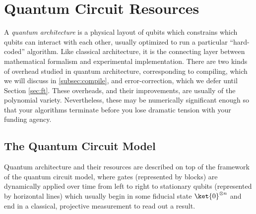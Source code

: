 \section{Quantum Circuit Resources}
\label{sec:circuit}

A \emph{quantum architecture} is a physical layout of qubits which constrains
which qubits can interact with each other, usually optimized to run a particular
``hard-coded'' algorithm. Like classical architecture, it is the
connecting layer between mathematical formalism and experimental implementation.
There are two kinds of overhead studied in quantum architecture,
corresponding to compiling, which we will discuss in \ref{subsec:compile},
and error-correction, which we defer until Section \ref{sec:ft}. These
overheads, and their improvements, are usually of the polynomial variety.
Nevertheless, these may be numerically significant enough so that your
algorithms terminate before you lose dramatic tension with
your funding agency.


\subsection{The Quantum Circuit Model}

Quantum architecture and their resources are described on top of the framework of
the quantum circuit model, where gates (represented by blocks)
are dynamically applied over time
from left to right 
to stationary qubits (represented by horizontal lines) which usually begin in some
fiducial state $\ket{0}^{\otimes n}$ and end in a classical, projective measurement
to read out a result.

